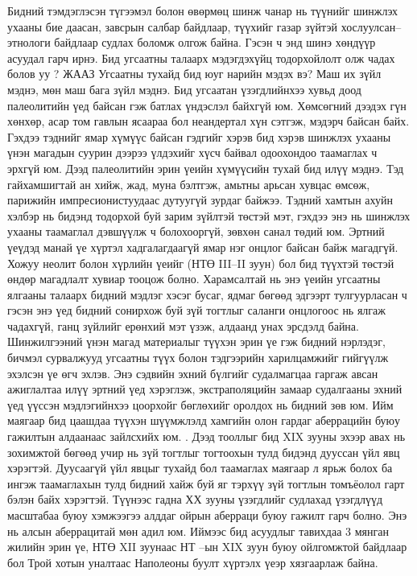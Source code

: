 Бидний тэмдэглэсэн түгээмэл болон өвөрмөц шинж чанар нь түүнийг шинжлэх ухааны бие даасан, завсрын салбар байдлаар, түүхийг газар зүйтэй хослуулсан–этнологи байдлаар судлах боломж олгож байна. Гэсэн ч энд шинэ хөндүүр асуудал гарч ирнэ. Бид угсаатны талаарх мэдэгдэхүйц тодорхойлолт олж чадах болов уу ?
ЖААЗ
Угсаатны тухайд бид юуг нарийн мэдэх вэ? Маш их зүйл мэднэ, мөн маш бага зүйл мэднэ. Бид угсаатан үзэгдлийнхээ хувьд доод палеолитийн үед байсан гэж батлах үндэслэл байхгүй юм. Хөмсөгний дээдэх гүн хөнхөр, асар том гавлын ясаараа бол неандертал хүн сэтгэж, мэдэрч байсан байх. Гэхдээ тэднийг ямар хүмүүс байсан гэдгийг хэрэв бид хэрэв шинжлэх ухааны үнэн магадын суурин дээрээ үлдэхийг хүсч байвал одоохондоо таамаглах ч эрхгүй юм.
Дээд палеолитийн эрин үеийн хүмүүсийн тухай бид илүү мэднэ. Тэд гайхамшигтай ан хийж, жад, муна бэлтгэж, амьтны арьсан хувцас өмсөж, парижийн импресионистуудаас дутуугүй зурдаг байжээ. Тэдний хамтын ахуйн хэлбэр нь бидэнд тодорхой буй зарим зүйлтэй төстэй мэт, гэхдээ энэ нь шинжлэх ухааны таамаглал дэвшүүлж ч болохооргүй, зөвхөн санал төдий юм. Эртний үеүдэд манай үе хүртэл хадгалагдаагүй ямар нэг онцлог байсан байж магадгүй.
Хожуу неолит болон хүрлийн үеийг (НТӨ III–II зуун) бол бид түүхтэй төстэй өндөр магадлалт хувиар тооцож болно. Харамсалтай нь энэ үеийн угсаатны ялгааны талаарх бидний мэдлэг хэсэг бусаг, ядмаг бөгөөд эдгээрт тулгуурласан ч гэсэн энэ үед бидний сонирхож буй зүй тогтлыг саланги онцлогоос нь ялгаж чадахгүй, ганц зүйлийг ерөнхий мэт үзэж, алдаанд унах эрсдэлд байна.
Шинжилгээний үнэн магад материалыг түүхэн эрин үе гэж бидний нэрлэдэг, бичмэл сурвалжууд угсаатны түүх болон тэдгээрийн харилцамжийг гийгүүлж эхэлсэн үе өгч эхлэв. Энэ сэдвийн эхний бүлгийг судалмагцаа гаргаж авсан ажиглалтаа илүү эртний үед хэрэглэж, экстраполяцийн замаар судалгааны эхний үед үүссэн мэдлэгийнхээ цоорхойг бөглөхийг оролдох нь бидний зөв юм. Ийм маягаар бид цаашдаа түүхэн шүүмжлэлд хамгийн олон гардаг аберрацийн буюу гажилтын алдаанаас зайлсхийх юм. .
Дээд тооллыг бид XIX зууны эхээр авах нь зохимжтой бөгөөд учир нь зүй тогтлыг тогтоохын тулд бидэнд дууссан үйл явц хэрэгтэй. Дуусаагүй үйл явцыг тухайд бол таамаглах маягаар л ярьж болох ба ингэж таамаглахын тулд бидний хайж буй яг тэрхүү зүй тогтлын томъёолол гарт бэлэн байх хэрэгтэй. Түүнээс гадна ХХ зууны үзэгдлийг судлахад үзэгдлүүд масштабаа буюу хэмжээгээ алддаг ойрын аберраци буюу гажилт гарч болно. Энэ нь алсын аберрацитай мөн адил юм. Иймээс бид асуудлыг тавихдаа 3 мянган жилийн эрин үе, НТӨ XII зуунаас НТ –ын XIX зуун буюу ойлгомжтой байдлаар бол Трой хотын уналтаас Наполеоны буулт хүртэлх үеэр хязгаарлаж байна.

